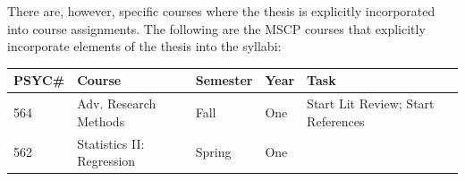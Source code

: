 \documentclass[openany]{book}
\begin{document}
There are, however, specific courses where the thesis is explicitly incorporated into course assignments. The following are the MSCP courses that explicitly incorporate elements of the thesis into the syllabi:

\begin{longtable}[]{@{}lllll@{}}
\toprule
\begin{minipage}[b]{0.03\columnwidth}\raggedright
PSYC\#\strut
\end{minipage} & \begin{minipage}[b]{0.27\columnwidth}\raggedright
Course\strut
\end{minipage} & \begin{minipage}[b]{0.26\columnwidth}\raggedright
Semester\strut
\end{minipage} & \begin{minipage}[b]{0.10\columnwidth}\raggedright
Year\strut
\end{minipage} & \begin{minipage}[b]{0.19\columnwidth}\raggedright
Task\strut
\end{minipage}\tabularnewline
\midrule
\endhead
\begin{minipage}[t]{0.03\columnwidth}\raggedright
564\strut
\end{minipage} & \begin{minipage}[t]{0.27\columnwidth}\raggedright
Adv. Research Methods\strut
\end{minipage} & \begin{minipage}[t]{0.26\columnwidth}\raggedright
Fall\strut
\end{minipage} & \begin{minipage}[t]{0.10\columnwidth}\raggedright
One\strut
\end{minipage} & \begin{minipage}[t]{0.19\columnwidth}\raggedright
Start Lit Review; Start References\strut
\end{minipage}\tabularnewline
\begin{minipage}[t]{0.03\columnwidth}\raggedright
562\strut
\end{minipage} & \begin{minipage}[t]{0.27\columnwidth}\raggedright
Statistics II: Regression\strut
\end{minipage} & \begin{minipage}[t]{0.26\columnwidth}\raggedright
Spring\strut
\end{minipage} & \begin{minipage}[t]{0.10\columnwidth}\raggedright
One\strut

\end{minipage}
\end{longtable}
\end{document}
